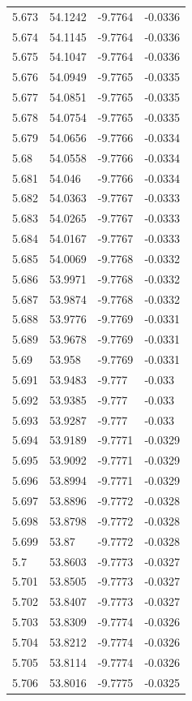 \begin{tabular}{llll}
5.673 & 54.1242 & -9.7764 & -0.0336 \\
5.674 & 54.1145 & -9.7764 & -0.0336 \\
5.675 & 54.1047 & -9.7764 & -0.0336 \\
5.676 & 54.0949 & -9.7765 & -0.0335 \\
5.677 & 54.0851 & -9.7765 & -0.0335 \\
5.678 & 54.0754 & -9.7765 & -0.0335 \\
5.679 & 54.0656 & -9.7766 & -0.0334 \\
5.68 & 54.0558 & -9.7766 & -0.0334 \\
5.681 & 54.046 & -9.7766 & -0.0334 \\
5.682 & 54.0363 & -9.7767 & -0.0333 \\
5.683 & 54.0265 & -9.7767 & -0.0333 \\
5.684 & 54.0167 & -9.7767 & -0.0333 \\
5.685 & 54.0069 & -9.7768 & -0.0332 \\
5.686 & 53.9971 & -9.7768 & -0.0332 \\
5.687 & 53.9874 & -9.7768 & -0.0332 \\
5.688 & 53.9776 & -9.7769 & -0.0331 \\
5.689 & 53.9678 & -9.7769 & -0.0331 \\
5.69 & 53.958 & -9.7769 & -0.0331 \\
5.691 & 53.9483 & -9.777 & -0.033 \\
5.692 & 53.9385 & -9.777 & -0.033 \\
5.693 & 53.9287 & -9.777 & -0.033 \\
5.694 & 53.9189 & -9.7771 & -0.0329 \\
5.695 & 53.9092 & -9.7771 & -0.0329 \\
5.696 & 53.8994 & -9.7771 & -0.0329 \\
5.697 & 53.8896 & -9.7772 & -0.0328 \\
5.698 & 53.8798 & -9.7772 & -0.0328 \\
5.699 & 53.87 & -9.7772 & -0.0328 \\
5.7 & 53.8603 & -9.7773 & -0.0327 \\
5.701 & 53.8505 & -9.7773 & -0.0327 \\
5.702 & 53.8407 & -9.7773 & -0.0327 \\
5.703 & 53.8309 & -9.7774 & -0.0326 \\
5.704 & 53.8212 & -9.7774 & -0.0326 \\
5.705 & 53.8114 & -9.7774 & -0.0326 \\
5.706 & 53.8016 & -9.7775 & -0.0325 \\

\end{tabular}
